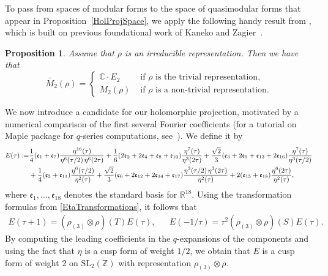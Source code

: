 \documentclass[11pt,reqno]{amsart}
\newtheorem{prp}[theorem]{Proposition}
\newcommand{\C}{\mathbb{C}}
\newcommand{\Z}{\mathbb{Z}}
\renewcommand{\=}{\;=\;}
\theoremstyle{myremark}
\begin{document}
To pass from spaces of modular forms to the space of quasimodular forms that appear in Proposition~\ref{HolProjSpace}, we apply the following handy result from \cite[Proposition~2.2]{IRR}, which is built on previous foundational work of Kaneko and Zagier~\cite{KZ95}.
\begin{prp}\label{NoQuasiForms}
Assume that $\rho$ is an irreducible representation. 
Then we have that
    \[
    \widetilde{M_2}(\rho)=\begin{cases}
        \C\cdot E_2 & \text{ if } \rho \text{ is the trivial representation},
        \\
        M_2(\rho) & \text{ if } \rho \text{ is a  non-trivial representation}.
    \end{cases}
    \]
\end{prp}
We now introduce a candidate for our holomorphic projection, motivated by a numerical comparison of the first several Fourier coefficients (for a tutorial on Maple package for $q$-series computations, see~\cite{Garvan1999}).
We define it by
\begin{equation}\label{eq: E}
\small
\begin{split}
E(\tau):=&\frac{1}{4}(\mathfrak{e}_1+\mathfrak{e}_7)\frac{\eta^{16}(\tau)}{\eta^6(\tau/2)\,\eta^6(2\tau)}+\frac{1}{6}(2\mathfrak{e}_2+2\mathfrak{e}_4+\mathfrak{e}_8+\mathfrak{e}_{10})\frac{\eta^7(\tau)}{\eta^3(2\tau)}
+\frac{\sqrt2}{3}(\mathfrak{e}_3+2\mathfrak{e}_9+\mathfrak{e}_{13}+2\mathfrak{e}_{16})\frac{\eta^7(\tau)}{\eta^3(\tau/2)}
\\&
+\frac{1}{4}(\mathfrak{e}_5+\mathfrak{e}_{11})\frac{\eta^6(\tau/2)}{\eta^2(\tau)}+\frac{\sqrt2}{3}(\mathfrak{e}_6+2\mathfrak{e}_{12}+2\mathfrak{e}_{14}+\mathfrak{e}_{17})\frac{\eta^3(\tau/2)\,\eta^3(2\tau)}{\eta^2(\tau)}+2(\mathfrak{e}_{15}+\mathfrak{e}_{18})\frac{\eta^6(2\tau)}{\eta^2(\tau)},
\end{split}
\end{equation}
where $\mathfrak{e}_1,\ldots,\mathfrak{e}_{18}$ denotes the standard basis for $\mathbb{R}^{18}$.
Using the  transformation formulas from \eqref{EtaTransformations}, it follows that
\begin{align*}
E(\tau+1)=(\rho_{(3)}\!\otimes\rho)(T) E(\tau), && E(-1/\tau)=\tau^2 (\rho_{(3)}\!\otimes\rho)(S) E(\tau).
\end{align*}
By computing the leading coefficients in the $q$-expansions of the components and using the fact that $\eta$ is a cusp form of weight $1/2$, we obtain that $E$ is a cusp form of weight $2$ on $\mathrm{SL}_2(\Z)$ with representation $\rho_{(3)}\!\otimes\rho$.
\end{document}

